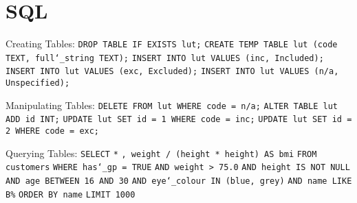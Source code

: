 \section{SQL}

Creating Tables:\newline
\texttt{DROP TABLE IF EXISTS lut;}\newline
\texttt{CREATE TEMP TABLE lut (code TEXT, full\char`_string TEXT);}\newline
\texttt{INSERT INTO lut VALUES (\textquotesingle inc\textquotesingle, \textquotesingle Included\textquotesingle);}\newline
\texttt{INSERT INTO lut VALUES (\textquotesingle exc\textquotesingle, \textquotesingle Excluded\textquotesingle);}\newline
\texttt{INSERT INTO lut VALUES (\textquotesingle n/a\textquotesingle, \textquotesingle Unspecified\textquotesingle);}

\vspace{\baselineskip}
Manipulating Tables:\newline
\texttt{DELETE FROM lut WHERE code = \textquotesingle n/a\textquotesingle;}\newline
\texttt{ALTER TABLE lut ADD id INT;}\newline
\texttt{UPDATE lut SET id = 1 WHERE code = \textquotesingle inc\textquotesingle;}\newline
\texttt{UPDATE lut SET id = 2 WHERE code = \textquotesingle exc\textquotesingle;}

\vspace{\baselineskip}
Querying Tables:\newline
\texttt{SELECT}\newline
\texttt{*}\newline
\texttt{, weight / (height * height) AS bmi}\newline
\texttt{FROM customers}\newline
\texttt{WHERE has\char`_gp = TRUE}\newline
\texttt{AND weight > 75.0}\newline
\texttt{AND height IS NOT NULL}\newline
\texttt{AND age BETWEEN 16 AND 30}\newline
\texttt{AND eye\char`_colour IN (\textquotesingle blue\textquotesingle, \textquotesingle grey\textquotesingle)}\newline
\texttt{AND name LIKE \textquotesingle B\%\textquotesingle}\newline
\texttt{ORDER BY name}\newline
\texttt{LIMIT 1000}

